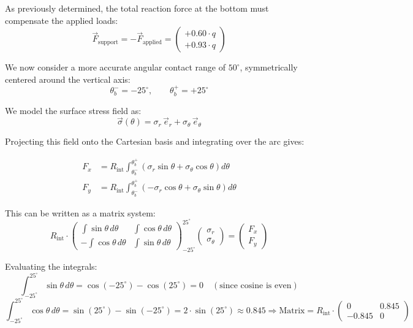 \documentclass[12pt]{article}
\begin{document}
As previously determined, the total reaction force at the bottom must compensate the applied loads:
\[
\vec{F}_{\text{support}} = -\vec{F}_{\text{applied}} =
\begin{pmatrix}
+0.60 \cdot q \\
+0.93 \cdot q
\end{pmatrix}
\]

We now consider a more accurate angular contact range of $50^\circ$, symmetrically centered around the vertical axis:
\[
\theta_b^- = -25^\circ, \qquad \theta_b^+ = +25^\circ
\]

We model the surface stress field as:
\[
\vec{\sigma}(\theta) = \sigma_r \, \vec{e}_r + \sigma_\theta \, \vec{e}_\theta
\]

Projecting this field onto the Cartesian basis and integrating over the arc gives:

\begin{align*}
F_x &= R_{\text{int}} \int_{\theta_b^-}^{\theta_b^+} \left( \sigma_r \sin\theta + \sigma_\theta \cos\theta \right) d\theta \\
F_y &= R_{\text{int}} \int_{\theta_b^-}^{\theta_b^+} \left( -\sigma_r \cos\theta + \sigma_\theta \sin\theta \right) d\theta
\end{align*}

This can be written as a matrix system:
\[
R_{\text{int}} \cdot
\begin{pmatrix}
\int \sin\theta \, d\theta & \int \cos\theta \, d\theta \\
-\int \cos\theta \, d\theta & \int \sin\theta \, d\theta
\end{pmatrix}_{-25^\circ}^{25^\circ}
\begin{pmatrix}
\sigma_r \\
\sigma_\theta
\end{pmatrix}
=
\begin{pmatrix}
F_x \\
F_y
\end{pmatrix}
\]

Evaluating the integrals:
\[
\int_{-25^\circ}^{25^\circ} \sin\theta \, d\theta = \cos(-25^\circ) - \cos(25^\circ) = 0 \quad (\text{since cosine is even})
\]
\[
\int_{-25^\circ}^{25^\circ} \cos\theta \, d\theta = \sin(25^\circ) - \sin(-25^\circ) = 2 \cdot \sin(25^\circ) \approx 0.845

\Rightarrow
\text{Matrix} =
R_{\text{int}} \cdot
\begin{pmatrix}
0 & 0.845 \\
-0.845 & 0
\end{pmatrix}
\]
\end{document}
